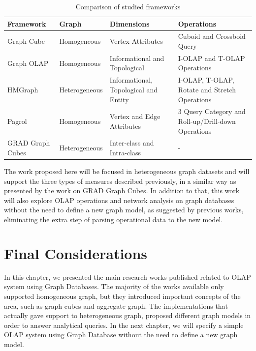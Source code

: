 \begin{table}[!ht]
\setlength\extrarowheight{2pt}
\caption{Comparison of studied frameworks}
\label{tb:table1}
\begin{tabularx}{\textwidth}{|Y|Z|Z|Z|}
\hline
{}\textbf{Framework} & \textbf{Graph} & \textbf{Dimensions} & \textbf{Operations}\\\hline
{ Graph Cube} & Homogeneous & Vertex Attributes & Cuboid and Crossboid Query\\\hline
{ Graph OLAP} & Homogeneous & Informational and Topological & I-OLAP and T-OLAP Operations\\\hline
{ HMGraph} & Heterogeneous & Informational, Topological and Entity & I-OLAP, T-OLAP, Rotate and Stretch Operations\\\hline
{ Pagrol} & Homogeneous & Vertex and Edge Attributes & 3 Query Category and Roll-up/Drill-down Operations \\ \hline
{ GRAD Graph Cubes} & Heterogeneous & Inter-class and Intra-class & - \\ \hline
\end{tabularx}
\end{table}

The work proposed here will be focused in heterogeneous graph datasets and will support the three types of measures described previously, in a similar way as presented by the work on GRAD Graph Cubes. In addition to that, this work will also explore OLAP operations and network analysis on graph databases without the need to define a new graph model, as suggested by previous works, eliminating the extra step of parsing operational data to the new model.

\section{Final Considerations}

In this chapter, we presented the main research works published related to OLAP system using Graph Databases. The majority of the works available only supported homogeneous graph, but they introduced important concepts of the area, such as graph cubes and aggregate graph. The implementations that actually gave support to heterogeneous graph, proposed different graph models in order to answer analytical queries. In the next chapter, we will specify a simple OLAP system using Graph Database without the need to define a new graph model.
